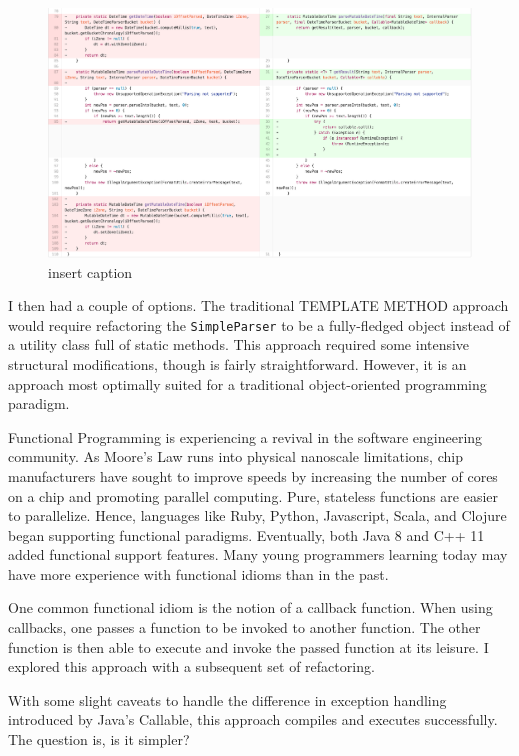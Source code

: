 \begin{figure}[H]
	\centering
	\includegraphics[width=\linewidth]{code94}
	\caption{insert caption}
\end{figure}

I then had a couple of options. The traditional TEMPLATE METHOD approach would require refactoring the \texttt{SimpleParser} to be a fully-fledged object instead of a utility class full of static methods. This approach required some intensive structural modifications, though is fairly straightforward. However, it is an approach most optimally suited for a traditional object-oriented programming paradigm. 

Functional Programming is experiencing a revival in the software engineering community. As Moore’s Law runs into physical nanoscale limitations, chip manufacturers have sought to improve speeds by increasing the number of cores on a chip and promoting parallel computing. Pure, stateless functions are easier to parallelize. Hence, languages like Ruby, Python, Javascript, Scala, and Clojure began supporting functional paradigms. Eventually, both Java 8 and C++ 11 added functional support features. Many young programmers learning today may have more experience with functional idioms than in the past.

One common functional idiom is the notion of a callback function. When using callbacks, one passes a function to be invoked to another function. The other function is then able to execute and invoke the passed function at its leisure. I explored this approach with a subsequent set of refactoring.

With some slight caveats to handle the difference in exception handling introduced by Java’s Callable, this approach compiles and executes successfully. The question is, is it simpler?

